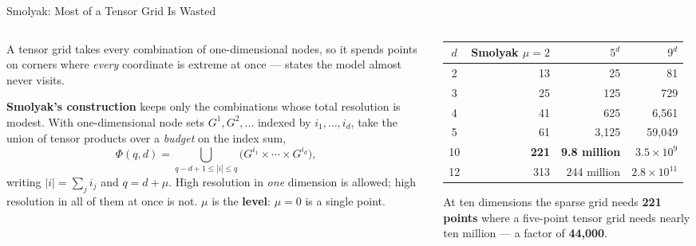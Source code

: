 \begin{frame}{Smolyak: Most of a Tensor Grid Is Wasted}
\begin{columns}[T]
\begin{column}{0.52\textwidth}
\small
A tensor grid takes every combination of one-dimensional nodes, so it spends points on corners where \emph{every} coordinate is extreme at once --- states the model almost never visits.
\medskip

\textbf{Smolyak's construction} keeps only the combinations whose total resolution is modest. With one-dimensional node sets $G^{1},G^{2},\dots$ indexed by $i_1,\dots,i_d$, take the union of tensor products over a \emph{budget} on the index sum,
\[
  \Phi(q,d)=\!\!\bigcup_{q-d+1\le|i|\le q}\!\!\big(G^{i_1}\!\times\cdots\times G^{i_d}\big),
\]
writing $|i|=\sum_j i_j$ and $q=d+\mu$. High resolution in \emph{one} dimension is allowed; high resolution in all of them at once is not. $\mu$ is the \textbf{level}: $\mu=0$ is a single point.
\end{column}
\begin{column}{0.45\textwidth}
\begin{center}\footnotesize
\begin{tabularx}{\linewidth}{@{}c r r r@{}}
\toprule
$d$ & \textbf{Smolyak $\mu{=}2$} & \textbf{$5^{d}$} & \textbf{$9^{d}$} \\
\midrule
2 & 13 & 25 & 81 \\
3 & 25 & 125 & 729 \\
4 & 41 & 625 & 6{,}561 \\
5 & 61 & 3{,}125 & 59{,}049 \\
10 & \textbf{221} & \textbf{9.8 million} & $3.5\times10^{9}$ \\
12 & 313 & 244 million & $2.8\times10^{11}$ \\
\bottomrule
\end{tabularx}
\end{center}
\vspace{1mm}
\begin{takeawaybox}\footnotesize
At ten dimensions the sparse grid needs \textbf{221 points} where a five-point tensor grid needs nearly ten million --- a factor of \textbf{44{,}000}.
\end{takeawaybox}
\end{column}
\end{columns}
\vspace{1mm}
\end{frame}

